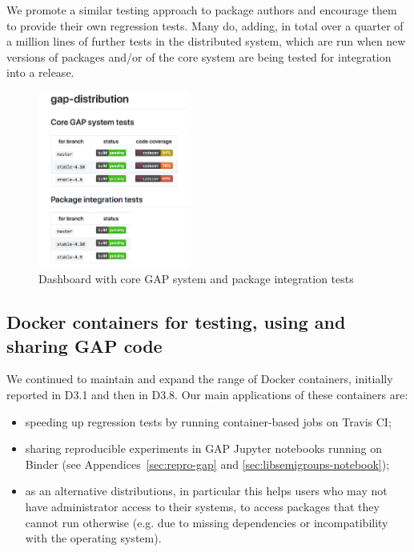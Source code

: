 We promote a similar testing approach to \GAP package authors and
encourage them to provide their own regression
tests. Many do, adding, in total over a quarter of a million lines of
further tests in the distributed system, which are run when new
versions of packages and/or of the core system are being tested for
integration into a release.

\begin{figure}[!ht]
    \centering
    \includegraphics[width=5cm]{images/gap-core-tests}
    \caption{Dashboard with core GAP system and package integration tests}
    \label{fig:gap-core-tests}
\end{figure}

\subsection{Docker containers for testing, using and sharing GAP code}\label{docker}

We continued to maintain and expand the range of Docker containers,
initially reported in D3.1 and then in D3.8. Our main applications of
these containers are:
\begin{itemize}
\item speeding up regression tests by running container-based jobs on Travis CI;
\item sharing reproducible experiments in GAP Jupyter notebooks running on
  Binder (see Appendices~\ref{sec:repro-gap} and
  \ref{sec:libsemigroups-notebook});
\item as an alternative distributions,
  in particular this helps users who may not have administrator access
  to their systems, to access packages that they cannot run otherwise
  (e.g. due to missing dependencies or incompatibility with the operating system).
\end{itemize}

